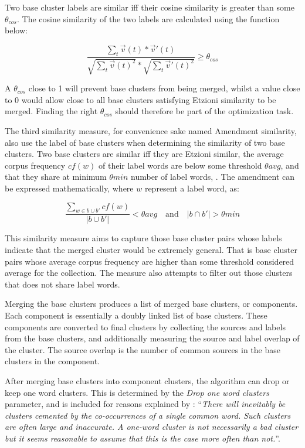 Two base cluster labels are similar iff their cosine similarity is greater than some \(\theta_{cos}\). The cosine similarity of the two labels are calculated using the function below:

\begin{displaymath}
\frac{\sum_{t}\vec{v}(t) * \vec{v}'(t)}
{\sqrt{\sum_{t}\vec{v}(t)^2} * \sqrt{\sum_{t}\vec{v}'(t)^2}}
\ge \theta_{cos}
\end{displaymath}

A \(\theta_{cos}\) close to 1 will prevent base clusters from being merged, whilst a value close to 0 would allow close to all base clusters satisfying Etzioni similarity to be merged. Finding the right \(\theta_{cos}\) should therefore be part of the optimization task.

The third similarity measure, for convenience sake named Amendment similarity, also use the label of base clusters when determining the similarity of two base clusters. Two base clusters are similar iff they are Etzioni similar, the average corpus frequency \(cf(w)\) of their label words are below some threshold \(\theta avg\), and that they share at minimum \(\theta min\) number of label words, \parencite{Moe2014}. The amendment can be expressed mathematically, where \(w\) represent a label word, as:

\begin{displaymath}
\frac{\sum\limits_{w \in b \cup b'} cf(w)}{\vert b \cup b' \vert} < \theta avg \quad \text{and} \quad \vert b \cap b' \vert > \theta min
\end{displaymath}

This similarity measure aims to capture those base cluster pairs whose labels indicate that the merged cluster would be extremely general. That is base cluster pairs whose average corpus frequency are higher than some threshold considered average for the collection. The measure also attempts to filter out those clusters that does not share label words.

Merging the base clusters produces a list of merged base clusters, or components. Each component is essentially a doubly linked list of base clusters. These components are converted to final clusters by collecting the sources and labels from the base clusters, and additionally measuring the source and label overlap of the cluster. The source overlap is the number of common sources in the base clusters in the component.

After merging base clusters into component clusters, the algorithm can drop or keep one word clusters. This is determined by the \emph{Drop one word clusters} parameter, and is included for reasons explained by \cite[][664]{Moe2014}: ``\textit{There will inevitably be clusters cemented by the co-occurrences of a single common word. Such clusters are often large and inaccurate. A one-word cluster is not necessarily a bad cluster but it seems reasonable to assume that this is the case more often than not.}''.

